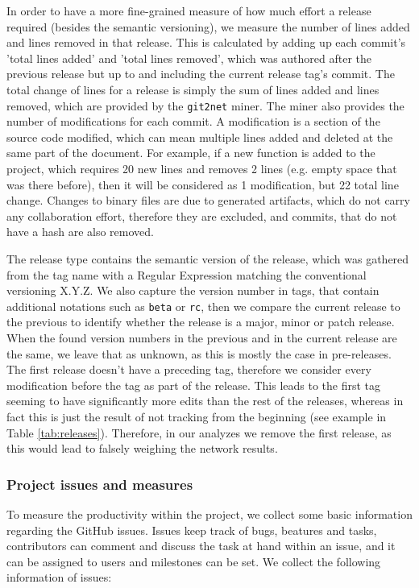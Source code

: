 In order to have a more fine-grained measure of how much effort a release required (besides the semantic versioning), we measure the number of lines added and lines removed in that release. This is calculated by adding up each commit's 'total lines added' and 'total lines removed', which was authored after the previous release but up to and including the current release tag's commit. The total change of lines for a release is simply the sum of lines added and lines removed, which are provided by the \texttt{git2net} miner. The miner also provides the number of modifications for each commit. A modification is a section of the source code modified, which can mean multiple lines added and deleted at the same part of the document. For example, if a new function is added to the project, which requires 20 new lines and removes 2 lines (e.g. empty space that was there before), then it will be considered as 1 modification, but 22 total line change. Changes to binary files are due to generated artifacts, which do not carry any collaboration effort, therefore they are excluded, and commits, that do not have a hash are also removed.

The release type contains the semantic version of the release, which was gathered from the tag name with a Regular Expression matching the conventional versioning X.Y.Z. We also capture the version number in tags, that contain additional notations such as \texttt{beta} or \texttt{rc}, then we compare the current release to the previous to identify whether the release is a major, minor or patch release. When the found version numbers in the previous and in the current release are the same, we leave that as unknown, as this is mostly the case in pre-releases. The first release doesn't have a preceding tag, therefore we consider every modification before the tag as part of the release. This leads to the first tag seeming to have significantly more edits than the rest of the releases, whereas in fact this is just the result of not tracking from the beginning (see example in Table \ref{tab:releases}). Therefore, in our analyzes we remove the first release, as this would lead to falsely weighing the network results.



\subsubsection{Project issues and measures}
\label{sec:project_issues}

To measure the productivity within the project, we collect some basic information regarding the GitHub issues. Issues keep track of bugs, beatures and tasks, contributors can comment and discuss the task at hand within an issue, and it can be assigned to users and milestones can be set. We collect the following information of issues:

